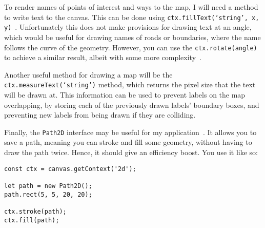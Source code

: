 To render names of points of interest and ways to the map, I will need a method to write text to the canvas. This can be done using \texttt{ctx.fillText(`string', x, y)}~\cite{mdn-canvas-draw-text}. Unfortunately this does not make provisions for drawing text at an angle, which would be useful for drawing names of roads or boundaries, where the name follows the curve of the geometry. However, you can use the \texttt{ctx.rotate(angle)} to achieve a similar result, albeit with some more complexity~\cite{mdn-canvas-rotating}.

Another useful method for drawing a map will be the \texttt{ctx.measureText(`string')} method, which returns the pixel size that the text will be drawn at. This information can be used to prevent labels on the map overlapping, by storing each of the previously drawn labels' boundary boxes, and preventing new labels from being drawn if they are colliding.

Finally, the \texttt{Path2D} interface may be useful for my application~\cite{mdn-canvas-path-2d}. It allows you to save a path, meaning you can stroke and fill some geometry, without having to draw the path twice. Hence, it should give an efficiency boost. You use it like so:

\begin{lstlisting}
const ctx = canvas.getContext('2d');

let path = new Path2D();
path.rect(5, 5, 20, 20);

ctx.stroke(path);
ctx.fill(path);
\end{lstlisting}
